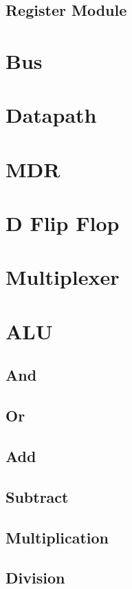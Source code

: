 \documentclass{article}
\begin{document}
    \subsection{Register Module} \label{A.2}
        
\section{Bus} \label{B}
    
\section{Datapath} \label{C}
    
\section{MDR} \label{D}
    
\section{D Flip Flop} \label{E}
    
\section{Multiplexer} \label{F}
    
\section{ALU} \label{G}
    
    \subsection{And}
    \subsection{Or}
    \subsection{Add}
    \subsection{Subtract}
    \subsection{Multiplication}
    \subsection{Division}
\end{document}
